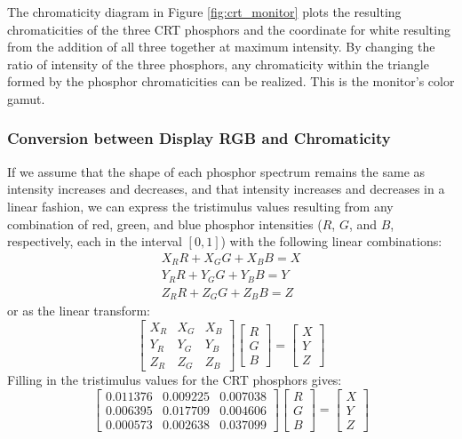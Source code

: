 \documentclass[twocolumn]{article}
\begin{document}
The chromaticity diagram in Figure \ref{fig:crt_monitor} plots the resulting chromaticities of the three CRT phosphors and the coordinate for white resulting from the addition of all three together at maximum intensity.  By changing the ratio of intensity of the three phosphors, any chromaticity within the triangle formed by the phosphor chromaticities can be realized.  This is the monitor's color gamut.
\subsubsection{Conversion between Display RGB and Chromaticity}
If we assume that the shape of each phosphor spectrum remains the same as intensity increases and decreases, and that intensity increases and decreases in a linear fashion, we can express the tristimulus values resulting from any combination of red, green, and blue phosphor intensities ($R$, $G$, and $B$, respectively, each in the interval $[0,1]$) with the following linear combinations:
\begin{equation}
    \begin{aligned}
        X_RR+X_GG+X_BB=X\\
        Y_RR+Y_GG+Y_BB=Y\\
        Z_RR+Z_GG+Z_BB=Z
    \end{aligned}
\end{equation}
or as the linear transform:
\begin{equation}
    \begin{bmatrix}
        X_R&X_G&X_B\\
        Y_R&Y_G&Y_B\\
        Z_R&Z_G&Z_B
    \end{bmatrix}\begin{bmatrix}
        R\\
        G\\
        B
    \end{bmatrix}=\begin{bmatrix}
        X\\
        Y\\
        Z
    \end{bmatrix}
\end{equation}
Filling in the tristimulus values for the CRT phosphors gives:
\begin{equation}\label{eq:crt_transformation}
    \begin{bmatrix}
        0.011376&0.009225&0.007038\\
        0.006395&0.017709&0.004606\\
        0.000573&0.002638&0.037099
    \end{bmatrix}\begin{bmatrix}
        R\\
        G\\
        B
    \end{bmatrix}=\begin{bmatrix}
        X\\
        Y\\
        Z
    \end{bmatrix}
\end{equation}
\end{document}
